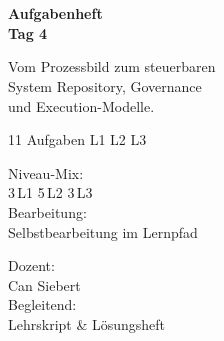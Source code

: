 \documentclass[11pt,a4paper,oneside]{article}
\begin{document}
\begin{titlepage}
  \pagestyle{empty}
  \vspace*{1.5cm}
  \\[2pt]
  \noindent{\color{lpAccent}\rule{\linewidth}{1.2pt}}\\[4pt]

  \vspace{3cm}
  {\sffamily\fontsize{30}{34}\selectfont\bfseries\color{lpInk}Aufgabenheft\\Tag 4\par}

  \vspace{0.7cm}
  {\sffamily\large\color{lpGray}Vom Prozessbild zum steuerbaren\\System \textendash{} Repository, Governance\\und Execution-Modelle.\par}

  \vspace{1.5cm}
  {\caveatfont\LARGE\color{lpAmber}11 Aufgaben \textperiodcentered{} L1 \textperiodcentered{} L2 \textperiodcentered{} L3}\par

  \vfill

  \noindent\begin{minipage}{0.55\linewidth}
    {\sffamily\footnotesize\color{lpGray}Niveau-Mix:}\\
    {\sffamily\small\color{lpInk}3\,\textsf{L1} \textperiodcentered{} 5\,\textsf{L2} \textperiodcentered{} 3\,\textsf{L3}}\\[10pt]
    {\sffamily\footnotesize\color{lpGray}Bearbeitung:}\\
    {\sffamily\small\color{lpInk}Selbstbearbeitung im Lernpfad}
  \end{minipage}\hfill
  \begin{minipage}{0.4\linewidth}
    \raggedleft
    {\sffamily\footnotesize\color{lpGray}Dozent:}\\
    {\sffamily\small\color{lpInk}Can Siebert}\\[10pt]
    {\sffamily\footnotesize\color{lpGray}Begleitend:}\\
    {\sffamily\small\color{lpInk}Lehrskript \& L\"osungsheft}
  \end{minipage}

  \vspace{0.5cm}
  \noindent{\color{lpAccent}\rule{\linewidth}{0.6pt}}
\end{titlepage}
\end{document}
